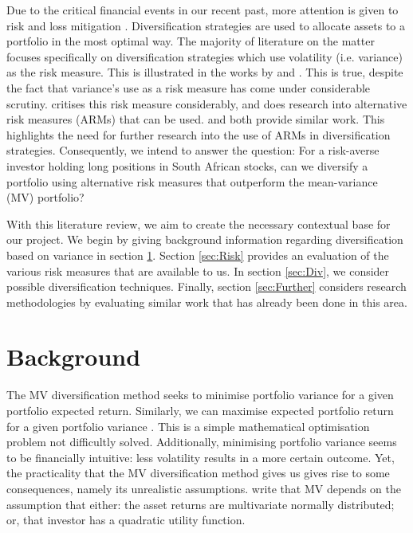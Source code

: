 \documentclass[12pt,a4paper]{article}
\begin{document}
Due to the critical financial events in our recent past, more attention is given to risk and loss mitigation \citep{righi2017simulation}. Diversification strategies are used to allocate assets to a portfolio in the most optimal way. The majority of literature on the matter focuses specifically on diversification strategies which use volatility (i.e. variance) as the risk measure. This is illustrated in the works by \citet*{CHEN20111179} and \citet*{chow2011survey}. This is true, despite the fact that variance's use as a risk measure has come under considerable scrutiny. \cite{byrne2004different} critises this risk measure considerably, and does research into alternative risk measures (ARMs) that can be used. \cite{righi2017simulation} and \citet*{hoe2010empirical} both provide similar work. This highlights the need for further research into the use of ARMs in diversification strategies. Consequently, we intend to answer the question: For a risk-averse investor holding long positions in South African stocks, can we diversify a portfolio using alternative risk measures that outperform the mean-variance (MV) portfolio?

With this literature review, we aim to create the necessary contextual base for our project. We begin by giving background information regarding diversification based on variance in section \ref{sec:Back}. Section \ref{sec:Risk} provides an evaluation of the various risk measures that are available to us. In section \ref{sec:Div}, we consider possible diversification techniques. Finally, section \ref{sec:Further} considers research methodologies by evaluating similar work that has already been done in this area.

\section{Background}
\label{sec:Back}

The MV diversification method seeks to minimise portfolio variance for a given portfolio expected return. Similarly, we can maximise expected portfolio return for a given portfolio variance \citep{markowitz1952portfolio}. This is a simple mathematical optimisation problem not difficultly solved. Additionally, minimising portfolio variance seems to be financially intuitive: less volatility results in a more certain outcome. Yet, the practicality that the MV diversification method gives us gives rise to some consequences, namely its unrealistic assumptions. \cite{hoe2010empirical} write that MV depends on the assumption that either: the asset returns are multivariate normally distributed; or, that investor has a quadratic utility function.
\end{document}
